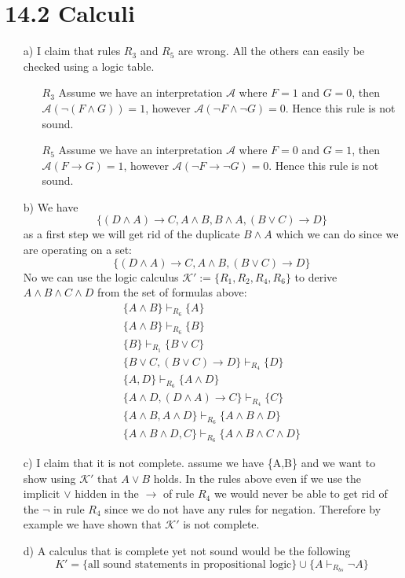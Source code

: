 \documentclass[12pt]{article}
\begin{document}
\section*{14.2 Calculi}
\begin{itemize}
    \item[a)] I claim that rules $R_3$ and $R_5$ are wrong. All the others can easily be checked using a logic table.
    \begin{itemize}
        \item[$R_3$] Assume we have an interpretation $\mathcal{A}$ where $F = 1$ and $G=0$, then $\mathcal{A}(\neg(F\land G)) = 1$, however $\mathcal{A}{(\neg F \land \neg G)} = 0$. Hence this rule is not sound.
        \item[$R_5$] Assume we have an interpretation $\mathcal{A}$ where $F = 0$ and $G=1$, then $\mathcal{A}(F \rightarrow  G) = 1$, however $\mathcal{A}(\neg F \rightarrow \neg G) = 0$. Hence this rule is not sound.
    \end{itemize}
    \item[b)] We have $$\{(D \land A) \rightarrow C, A \land B, B \land A, (B \lor C) \rightarrow D\}$$ as a first step we will get rid of the duplicate $B \land A$ which we can do since we are operating on a set: $$\{(D \land A) \rightarrow C, A \land B, (B \lor C) \rightarrow D\}$$ No we can use the logic calculus $\mathcal{K}' := \{R_1,R_2,R_4,R_6\}$ to derive $A\land B \land C \land D$ from the set of formulas above:
    \begin{equation*}
    \begin{gathered}
        \{A\land B\} \vdash_{R_6} \{A\}\\
        \{A\land B\} \vdash_{R_6} \{B\}\\
        \{B\} \vdash_{R_1} \{B \lor C\}\\
        \{B \lor C, (B \lor C) \rightarrow D\} \vdash_{R_4} \{D\}\\
        \{A,D\} \vdash_{R_6} \{A \land D\}\\
        \{A\land D , (D \land A) \rightarrow C\} \vdash_{R_4} \{C\}\\
        \{A \land B, A \land D\} \vdash_{R_6} \{A \land B \land D\}\\
        \{A \land B \land D , C\} \vdash_{R_6} \{A \land B \land C \land D\}
        \end{gathered}
    \end{equation*}
    
    \item[c)] I claim that it is not complete. assume we have \{A,B\} and we want to show using $\mathcal{K}'$ that $A \lor B$ holds. In the rules above even if we use the implicit $\lor$ hidden in the $\rightarrow$ of rule $R_4$ we would never be able to get rid of the $\neg$ in rule $R_4$ since we do not have any rules for negation. Therefore by example we have shown that $\mathcal{K'}$ is not complete.
    
    \item[d)] A calculus that is complete yet not sound would be the following $$K' = \{\text{all sound statements in propositional logic}\} \cup \{ A \vdash_{ R_{bs}} \neg A\}$$
    
    
\end{itemize}
\end{document}
